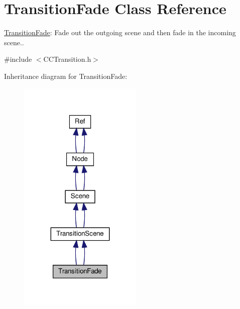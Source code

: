 \hypertarget{classTransitionFade}{}\section{Transition\+Fade Class Reference}
\label{classTransitionFade}


\hyperlink{classTransitionFade}{Transition\+Fade}\+: Fade out the outgoing scene and then fade in the incoming scene.\textquotesingle{}\textquotesingle{}\textquotesingle{}.  




{\ttfamily \#include $<$C\+C\+Transition.\+h$>$}



Inheritance diagram for Transition\+Fade\+:
\nopagebreak
\begin{figure}[H]
\begin{center}
\leavevmode
\includegraphics[width=167pt]{classTransitionFade__inherit__graph}
\end{center}
\end{figure}


